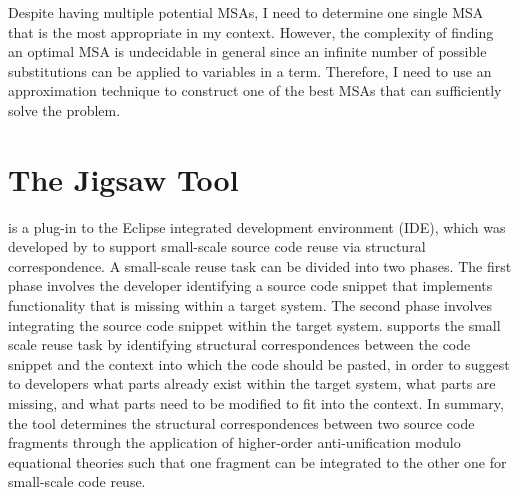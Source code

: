 Despite having multiple potential MSAs, I need to determine one single MSA that is the most appropriate in my context. However, the complexity of finding an optimal MSA is undecidable in general \cite{2008:fse:cottrell} since an infinite number of possible substitutions can be applied to variables in a term. Therefore, I need to use an approximation technique to construct one of the best MSAs that can sufficiently solve the problem.


\section{The Jigsaw Tool}\label{Jigsaw}

 is a plug-in to the Eclipse integrated development environment (IDE), which was developed by \citet{2008:fse:cottrell} to support small-scale source code reuse via structural correspondence. A small-scale reuse task can be divided into two phases. The first phase involves the developer identifying a source code snippet that implements functionality that is missing within a target system. The second phase involves integrating the source code snippet within the target system.
 supports the small scale reuse task by identifying structural correspondences between the code snippet and the context into which the code should be pasted, in order to suggest to developers what parts already exist within the target system, what parts are missing, and what parts need to be modified to fit into the context. In summary, the  tool determines the structural correspondences between two  source code fragments through the application of higher-order anti-unification modulo equational theories such that one fragment can be integrated to the other one for small-scale code reuse.



